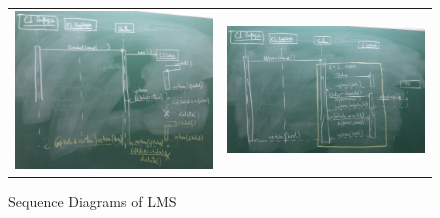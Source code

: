 \documentclass{article}
\begin{document}
\begin{figure}[!ht]
\centering
\begin{tabular}{ll}
\includegraphics[width=9cm]{Images/Sequence_1.jpg} &
\includegraphics[width=9cm]{Images/Sequence_2.jpg}
\end{tabular}
\caption{Sequence Diagrams of LMS
\label{fig:use-case}
}
\end{figure}

\vspace*{10cm}
\newpage
\end{document}

